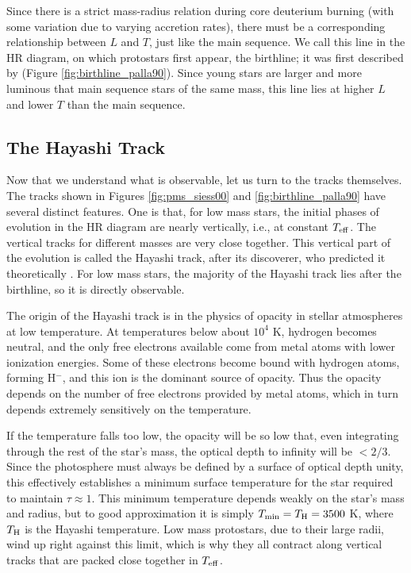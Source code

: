 Since there is a strict mass-radius relation during core deuterium burning (with some variation due to varying accretion rates), there must be a corresponding relationship between $L$ and $T$, just like the main sequence. We call this line in the HR diagram, on which protostars first appear, the birthline; it was first described by \citet{stahler83a} (Figure \ref{fig:birthline_palla90}). Since young stars are larger and more luminous that main sequence stars of the same mass, this line lies at higher $L$ and lower $T$ than the main sequence.

\subsection{The Hayashi Track}

Now that we understand what is observable, let us turn to the tracks themselves. The tracks shown in Figures \ref{fig:pms_siess00} and \ref{fig:birthline_palla90} have several distinct features. One is that, for low mass stars, the initial phases of evolution in the HR diagram are nearly vertically, i.e., at constant $T_{\rm eff}$. The vertical tracks for different masses are very close together. This vertical part of the evolution is called the Hayashi track, after its discoverer, who predicted it theoretically \citep{hayashi61a}. For low mass stars, the majority of the Hayashi track lies after the birthline, so it is directly observable.

The origin of the Hayashi track is in the physics of opacity in stellar atmospheres at low temperature. At temperatures below about $10^4$ K, hydrogen becomes neutral, and the only free electrons available come from metal atoms with lower ionization energies. Some of these electrons become bound with hydrogen atoms, forming H$^-$, and this ion is the dominant source of opacity.  Thus the opacity depends on the number of free electrons provided by metal atoms, which in turn depends extremely sensitively on the temperature.

If the temperature falls too low, the opacity will be so low that, even integrating through the rest of the star's mass, the optical depth to infinity will be $<2/3$. Since the photosphere must always be defined by a surface of optical depth unity, this effectively establishes a minimum surface temperature for the star required to maintain $\tau \approx 1$. This minimum temperature depends weakly on the star's mass and radius, but to good approximation it is simply $T_{\rm min} = T_{\rm H} = 3500$ K, where $T_{\rm H}$ is the Hayashi temperature. Low mass protostars, due to their large radii, wind up right against this limit, which is why they all contract along vertical tracks that are packed close together in $T_{\rm eff}$.

